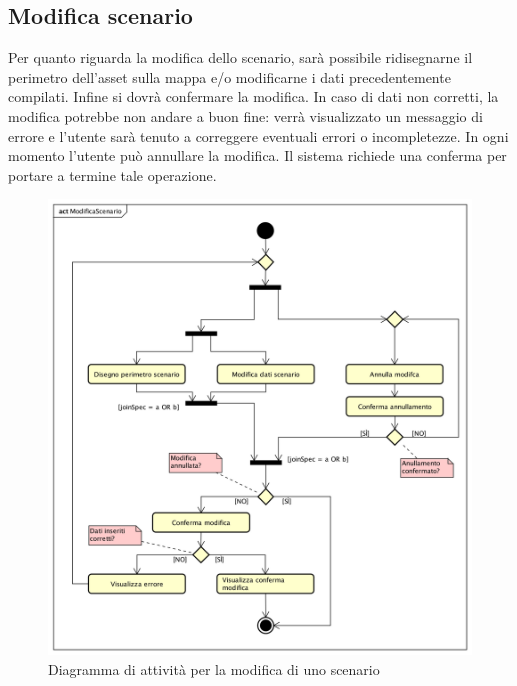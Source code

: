 \subsection{Modifica scenario}
Per quanto riguarda la modifica dello scenario, sarà possibile ridisegnarne il perimetro dell'asset sulla mappa e/o modificarne i dati precedentemente compilati. Infine si dovrà confermare la modifica. In caso di dati non corretti, la modifica potrebbe non andare a buon fine: verrà visualizzato un messaggio di errore e l'utente sarà tenuto a correggere eventuali errori o incompletezze.
In ogni momento l'utente può annullare la modifica. Il sistema richiede una conferma per portare a termine tale operazione.
\begin{figure}[H]
	\centering
	\includegraphics[width=\textwidth]{img/DiagrammiDiAttivita/ModificaScenario.png}
	\caption{Diagramma di attività per la modifica di uno scenario}
\end{figure}
